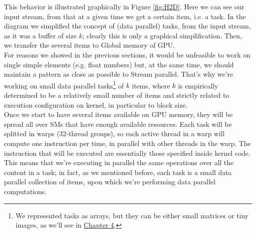 	This behavior is illustrated graphically in Figure \ref{fig:H2D}. Here we can see our input stream, from that at a given time we get a certain item, i.e. a task. In the diagram we simplified the concept of (data parallel) tasks, from the input stream, as it was a buffer of size \(k\); clearly this is only a graphical simplification. Then, we transfer the several items to Global memory of GPU.\\
	For reasons we showed in the previous sections, it would be unfeasible to work on single simple elements (e.g. float numbers) but, at the same time, we should maintain a pattern as close as possible to Stream parallel. That's why we're working on small data parallel tasks\footnote{We represented tasks as arrays, but they can be either small matrices or tiny images, as we'll see in \hyperref[chap:impl]{Chapter 4}.} of \(k\) items, where \(k\) is empirically determined to be a relatively small number of items and strictly related to execution configuration on kernel, in particular to block size.\\

	Once we start to have several items available on GPU memory, they will be spread all over SMs that have enough available resources. Each task will be splitted in warps (32-thread groups), so each active thread in a warp will compute one instruction per time, in parallel with other threads in the warp. The instruction that will be executed are essentially those specified inside kernel code.\\
	This means that we're executing in parallel the same operations over all the content in a task; in fact, as we mentioned before, each task is a small data parallel collection of items, upon which we're performing data parallel computations.  
	

